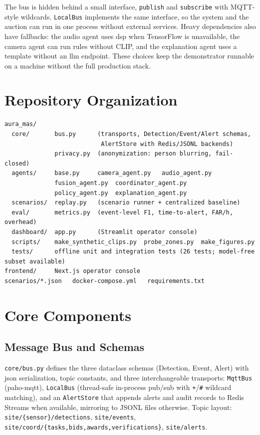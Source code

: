 The bus is hidden behind a small interface, \texttt{publish} and \texttt{subscribe} with MQTT-style wildcards. \texttt{LocalBus} implements the same interface, so the system and the auction can run in one process without external services. Heavy dependencies also have fallbacks: the audio agent uses \gls{dsp} when TensorFlow is unavailable, the camera agent can run rules without CLIP, and the explanation agent uses a template without an \gls{llm} endpoint. These choices keep the demonstrator runnable on a machine without the full production stack.

\section{Repository Organization}

\begin{verbatim}
aura_mas/
  core/       bus.py      (transports, Detection/Event/Alert schemas,
                           AlertStore with Redis/JSONL backends)
              privacy.py  (anonymization: person blurring, fail-closed)
  agents/     base.py     camera_agent.py   audio_agent.py
              fusion_agent.py  coordinator_agent.py
              policy_agent.py  explanation_agent.py
  scenarios/  replay.py   (scenario runner + centralized baseline)
  eval/       metrics.py  (event-level F1, time-to-alert, FAR/h, overhead)
  dashboard/  app.py      (Streamlit operator console)
  scripts/    make_synthetic_clips.py  probe_zones.py  make_figures.py
  tests/      offline unit and integration tests (26 tests; model-free subset available)
frontend/     Next.js operator console
scenarios/*.json   docker-compose.yml   requirements.txt
\end{verbatim}

\section{Core Components}

\subsection{Message Bus and Schemas}

\texttt{core/bus.py} defines the three dataclass schemas (Detection, Event, Alert) with \gls{json} serialization, topic constants, and three interchangeable transports: \texttt{MqttBus} (paho-mqtt), \texttt{LocalBus} (thread-safe in-process pub/sub with \texttt{+}/\texttt{\#} wildcard matching), and an \texttt{AlertStore} that appends alerts and audit records to Redis Streams when available, mirroring to JSONL files otherwise. Topic layout: \texttt{site/\{sensor\}/detections}, \texttt{site/events}, \texttt{site/coord/\{tasks,bids,awards,verifications\}}, \texttt{site/alerts}.

